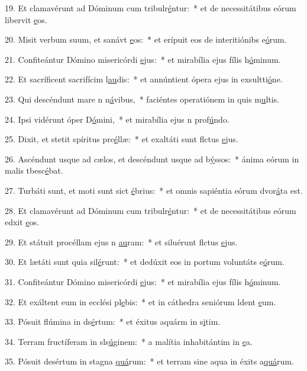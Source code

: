 19. Et clamavérunt ad Dóminum cum tribulr\uline{é}ntur:~* et de necessitátibus eórum libervit \uline{e}os.\par 
20. Misit verbum suum, et sanávt \uline{e}os:~* et erípuit eos de interitiónibs e\uline{ó}rum.\par 
21. Confiteántur Dómino misericórdi \uline{e}jus:~* et mirabília ejus fílis h\uline{ó}minum.\par 
22. Et sacríficent sacrifícim l\uline{au}dis:~* et annúntient ópera ejus in exsultti\uline{ó}ne.\par 
23. Qui descéndunt mare n n\uline{á}vibus,~* faciéntes operatiónem in quis m\uline{u}ltis.\par 
24. Ipsi vidérunt óper D\uline{ó}mini,~* et mirabília ejus n prof\uline{ú}ndo.\par 
25. Dixit, et stetit spíritus prc\uline{é}llæ:~* et exaltáti sunt flctus \uline{e}jus.\par 
26. Ascéndunt usque ad cælos, et descéndunt usque ad b\uline{ý}ssos:~* ánima eórum in malis tbesc\uline{é}bat.\par 
27. Turbáti sunt, et moti sunt sict \uline{é}brius:~* et omnis sapiéntia eórum dvor\uline{á}ta est.\par 
28. Et clamavérunt ad Dóminum cum tribulr\uline{é}ntur:~* et de necessitátibus eórum edxit \uline{e}os.\par 
29. Et státuit procéllam ejus n \uline{au}ram:~* et siluérunt flctus \uline{e}jus.\par 
30. Et lætáti sunt quia sil\uline{é}runt:~* et dedúxit eos in portum voluntáts e\uline{ó}rum.\par 
31. Confiteántur Dómino misericórdi \uline{e}jus:~* et mirabília ejus fílis h\uline{ó}minum.\par 
32. Et exáltent eum in ecclési pl\uline{e}bis:~* et in cáthedra seniórum ldent \uline{e}um.\par 
33. Pósuit flúmina in ds\uline{é}rtum:~* et éxitus aquárm in s\uline{i}tim.\par 
34. Terram fructíferam in sls\uline{ú}ginem:~* a malítia inhabitántim in \uline{e}a.\par 
35. Pósuit desértum in stagna \uline{quá}rum:~* et terram sine aqua in éxits a\uline{quá}rum.\par 
